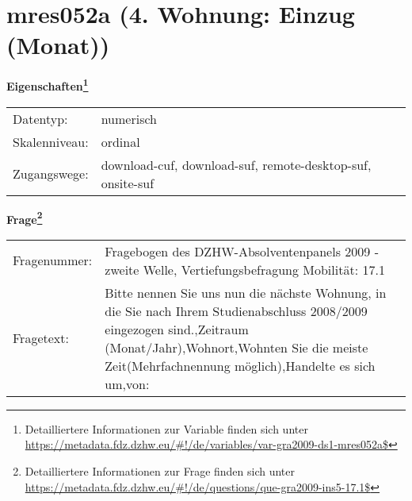 
    \setcounter{footnote}{0}

    \vspace*{-1.8cm}
	\section{mres052a (4. Wohnung: Einzug (Monat))}
	\label{section:mres052a}



    \vspace*{0.5cm}
    \noindent\textbf{Eigenschaften\footnote{Detailliertere Informationen zur Variable finden sich unter
		\url{https://metadata.fdz.dzhw.eu/\#!/de/variables/var-gra2009-ds1-mres052a$}}}\\
	\begin{tabularx}{\hsize}{@{}lX}
	Datentyp: & numerisch \\
	Skalenniveau: & ordinal \\
	Zugangswege: &
	  download-cuf, 
	  download-suf, 
	  remote-desktop-suf, 
	  onsite-suf
 \\
    \end{tabularx}



				\vspace*{0.5cm}
                \noindent\textbf{Frage\footnote{Detailliertere Informationen zur Frage finden sich unter
		              \url{https://metadata.fdz.dzhw.eu/\#!/de/questions/que-gra2009-ins5-17.1$}}}\\
				\begin{tabularx}{\hsize}{@{}lX}
					Fragenummer: &
					  Fragebogen des DZHW-Absolventenpanels 2009 - zweite Welle, Vertiefungsbefragung Mobilität:
					  17.1
 \\
					Fragetext: & Bitte nennen Sie uns nun die nächste Wohnung, in die Sie nach Ihrem Studienabschluss 2008/2009 eingezogen sind.,Zeitraum (Monat/Jahr),Wohnort,Wohnten Sie die meiste Zeit(Mehrfachnennung möglich),Handelte es sich um,von: \\
				\end{tabularx}





